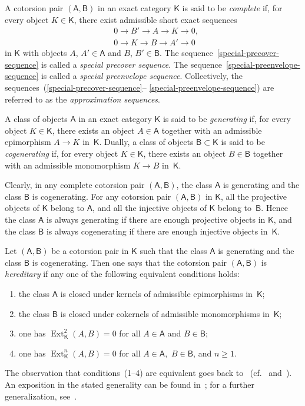 \documentclass[12pt,a4paper]{amsart}
\newcommand{\+}{\nobreakdash-}
\renewcommand{\:}{\colon}
\newcommand{\rarrow}{\longrightarrow}
\DeclareMathOperator{\Ext}{Ext}
\newcommand{\sA}{\mathsf A}
\newcommand{\sB}{\mathsf B}
\newcommand{\sK}{\mathsf K}
\theoremstyle{plain}
\theoremstyle{definition}
\begin{document}
 A cotorsion pair $(\sA,\sB)$ in an exact category $\sK$ is said to be
\emph{complete} if, for every object $K\in\sK$, there exist admissible
short exact sequences
\begin{align}
 & 0\rarrow B'\rarrow A\rarrow K\rarrow 0,
 \label{special-precover-sequence} \\
 & 0\rarrow K\rarrow B\rarrow A'\rarrow 0
 \label{special-preenvelope-sequence}
\end{align}
in $\sK$ with objects $A$, $A'\in\sA$ and $B$, $B'\in\sB$.
 The sequence~\eqref{special-precover-sequence} is called
a \emph{special precover sequence}.
 The sequence~\eqref{special-preenvelope-sequence} is called
a \emph{special preenvelope sequence}.
 Collectively, the sequences~(\ref{special-precover-sequence}\+-%
\ref{special-preenvelope-sequence}) are referred to as
the \emph{approximation sequences}.

 A class of objects $\sA$ in an exact category $\sK$ is said to be
\emph{generating} if, for every object $K\in\sK$, there exists
an object $A\in\sA$ together with an admissible epimorphism $A\rarrow K$
in~$\sK$.
 Dually, a class of objects $\sB\subset\sK$ is said to be
\emph{cogenerating} if, for every object $K\in\sK$, there exists
an object $B\in\sB$ together with an admissible monomorphism
$K\rarrow B$ in~$\sK$.

 Clearly, in any complete cotorsion pair $(\sA,\sB)$, the class $\sA$
is generating and the class $\sB$ is cogenerating.
 For any cotorsion pair $(\sA,\sB)$ in $\sK$, all the projective
objects of $\sK$ belong to $\sA$, and all the injective objects of $\sK$
belong to~$\sB$.
 Hence the class $\sA$ is always generating if there are enough
projective objects in $\sK$, and the class $\sB$ is always cogenerating
if there are enough injective objects in~$\sK$.

 Let $(\sA,\sB)$ be a cotorsion pair in $\sK$ such that the class $\sA$
is generating and the class $\sB$ is cogenerating.
 Then one says that the cotorsion pair $(\sA,\sB)$ is \emph{hereditary}
if any one of the following equivalent conditions holds:
\begin{enumerate}
\item the class $\sA$ is closed under kernels of admissible epimorphisms
in~$\sK$;
\item the class $\sB$ is closed under cokernels of admissible
monomorphisms in~$\sK$;
\item one has $\Ext^2_\sK(A,B)=0$ for all $A\in\sA$ and $B\in\sB$;
\item one has $\Ext^n_\sK(A,B)=0$ for all $A\in\sA$, \,$B\in\sB$,
and $n\ge1$.
\end{enumerate}
 The observation that conditions~(1\+-4) are equivalent goes back
to~\cite[Theorem~1.2.10]{GR} (cf.~\cite[Lemma~5.24]{GT}
and~\cite[Lemma~2.3]{Gil2a}).
 An exposition in the stated generality can be found
in~\cite[Lemma~6.17]{Sto-ICRA}; for a further generalization,
see~\cite[Lemma~7.1]{PS6}.
\end{document}
